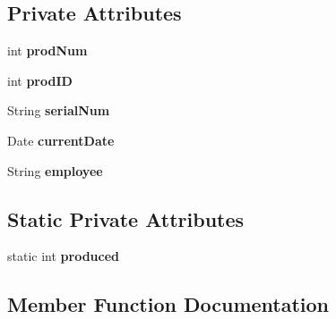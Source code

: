 \subsection*{Private Attributes}
\begin{DoxyCompactItemize}
\item 
\mbox{\label{class_g_u_i_project_1_1_production_record_afa4fb4dc0f5e701c331cbaf08c1b3985}} 
int {\bfseries prod\+Num}
\item 
\mbox{\label{class_g_u_i_project_1_1_production_record_a113b1e463bfbb3b55ebc2cc1f592ab7e}} 
int {\bfseries prod\+ID}
\item 
\mbox{\label{class_g_u_i_project_1_1_production_record_ac84e89b9fe1d3672c6696ce34833d8f8}} 
String {\bfseries serial\+Num}
\item 
\mbox{\label{class_g_u_i_project_1_1_production_record_ab6d9af13a943e84a799f936c0646d50c}} 
Date {\bfseries current\+Date}
\item 
\mbox{\label{class_g_u_i_project_1_1_production_record_adcde4851e9066f0bf780f10e1e6dbba2}} 
String {\bfseries employee}
\end{DoxyCompactItemize}
\subsection*{Static Private Attributes}
\begin{DoxyCompactItemize}
\item 
\mbox{\label{class_g_u_i_project_1_1_production_record_a2fc61d42ce35d95ed1bc1df39980b2e7}} 
static int {\bfseries produced}
\end{DoxyCompactItemize}


\subsection{Member Function Documentation}
\mbox{\label{class_g_u_i_project_1_1_production_record_a216bffccf7120bdeb9fff45eb1cd6fcd}} 

